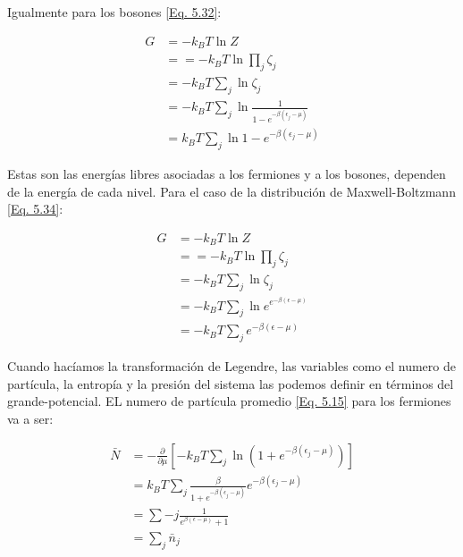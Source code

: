 \documentclass[11pt,fleqn]{book}
\begin{document}
Igualmente para los bosones \ref{Eq. 5.32}:

\begin{equation}
    \begin{split}
        G&=-k_{B}T\ln{Z}\\
        &==-k_{B}T\ln{\prod_{j}\zeta_{j}}\\
        &=-k_{B}T\sum_{j}\ln{\zeta_{j}}\\
        &=-k_{B}T\sum_{j}\ln{\frac{1}{1-e^{-\beta(\epsilon_{j}-\mu)}}}\\
        &=k_{B}T\sum_{j}\ln{1-e^{-\beta(\epsilon_{j}-\mu)}}
    \end{split}
\end{equation}

Estas son las energías libres asociadas a los fermiones y a los bosones, dependen de la energía de cada nivel. Para el caso de la distribución de Maxwell-Boltzmann \ref{Eq. 5.34}:


\begin{equation}
    \begin{split}
        G&=-k_{B}T\ln{Z}\\
        &==-k_{B}T\ln{\prod_{j}\zeta_{j}}\\
        &=-k_{B}T\sum_{j}\ln{\zeta_{j}}\\
        &=-k_{B}T\sum_{j}\ln{e^{e^{-\beta(\epsilon-\mu)}}}\\
        &=-k_{B}T\sum_{j}e^{-\beta(\epsilon-\mu)}
    \end{split}
\end{equation}

Cuando hacíamos la transformación de Legendre, las variables como el numero de partícula, la entropía y la presión del sistema las podemos definir en términos del grande-potencial. EL numero de partícula promedio \ref{Eq. 5.15}  para los fermiones va a ser:

\begin{equation}
    \begin{split}
        \bar{N}&=-\frac{\partial}{\partial\mu}\left[-k_{B}T\sum_{j}\ln{\left(1+e^{-\beta(\epsilon_{j}-\mu)}\right)}\right]\\
        &=k_{B}T\sum_{j}\frac{\beta}{1+e^{-\beta(\epsilon_{j}-\mu)}}e^{-\beta(\epsilon_{j}-\mu)}\\
        &=\sum-{j}\frac{1}{e^{\beta(\epsilon-\mu)}+1}\\
        &=\sum_{j}\bar{n}_{j}
    \end{split}
\end{equation}
\end{document}
